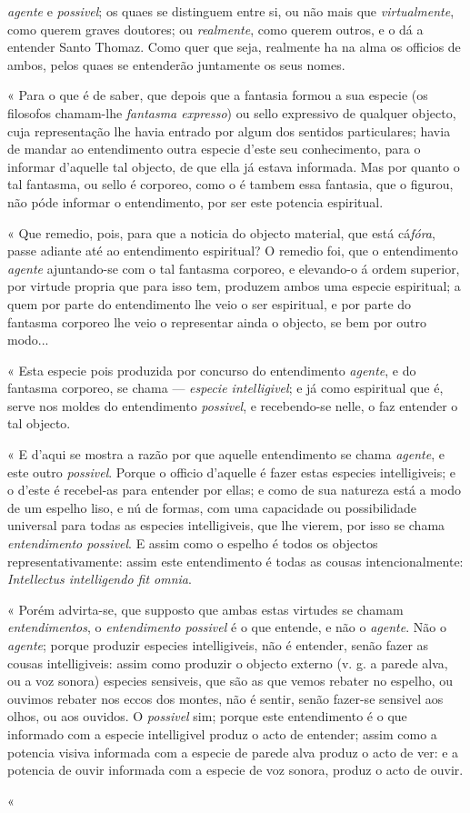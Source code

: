 \emph{agente} e \emph{possivel}; os quaes se distinguem entre si, ou não mais que \emph{virtualmente}, como querem graves doutores; ou \emph{realmente}, como querem outros, e o dá a entender Santo Thomaz. Como quer que seja, realmente ha na alma os officios de ambos, pelos quaes se entenderão juntamente os seus nomes.\par « Para o que é de saber, que depois que a fantasia formou a sua especie (os filosofos chamam-lhe \emph{fantasma expresso}) ou sello expressivo de qualquer objecto, cuja representação lhe havia entrado por algum dos sentidos particulares; havia de mandar ao entendimento outra especie d'este seu conhecimento, para o informar d'aquelle tal objecto, de que ella já estava informada. Mas por quanto o tal fantasma, ou sello é corporeo, como o é tambem essa fantasia, que o figurou, não póde informar o entendimento, por ser este potencia espiritual.\par « Que remedio, pois, para que a noticia do objecto material, que está cá\emph{fóra}, passe adiante até ao entendimento espiritual? O remedio foi, que o entendimento \emph{agente} ajuntando-se com o tal fantasma corporeo, e elevando-o á ordem superior, por virtude propria que para isso tem, produzem ambos uma especie espiritual; a quem por parte do entendimento lhe veio o ser espiritual, e por parte do fantasma corporeo lhe veio o representar ainda o objecto, se bem por outro modo...\par « Esta especie pois produzida por concurso do entendimento \emph{agente}, e do fantasma corporeo, se chama --- \emph{especie intelligivel}; e já como espiritual que é, serve nos moldes do entendimento \emph{possivel}, e recebendo-se nelle, o faz entender o tal objecto.\par « E d'aqui se mostra a razão por que aquelle entendimento se chama \emph{agente}, e este outro \emph{possivel}. Porque o officio d'aquelle é fazer estas especies intelligiveis; e o d'este é recebel-as para entender por ellas; e como de sua natureza está a modo de um espelho liso, e nú de formas, com uma capacidade ou possibilidade universal para todas as especies intelligiveis, que lhe vierem, por isso se chama \emph{entendimento possivel}. E assim como o espelho é todos os objectos representativamente: assim este entendimento é todas as cousas intencionalmente: \emph{Intellectus intelligendo fit omnia}.\par « Porém advirta-se, que supposto que ambas estas virtudes se chamam \emph{entendimentos}, o \emph{entendimento possivel} é o que entende, e não o \emph{agente}. Não o \emph{agente}; porque produzir especies intelligiveis, não é entender, senão fazer as cousas intelligiveis: assim como produzir o objecto externo (v. g. a parede alva, ou a voz sonora) especies sensiveis, que são as que vemos rebater no espelho, ou ouvimos rebater nos eccos dos montes, não é sentir, senão fazer-se sensivel aos olhos, ou aos ouvidos. O \emph{possivel} sim; porque este entendimento é o que informado com a especie intelligivel produz o acto de entender; assim como a potencia visiva informada com a especie de parede alva produz o acto de ver: e a potencia de ouvir informada com a especie de voz sonora, produz o acto de ouvir.\par « 